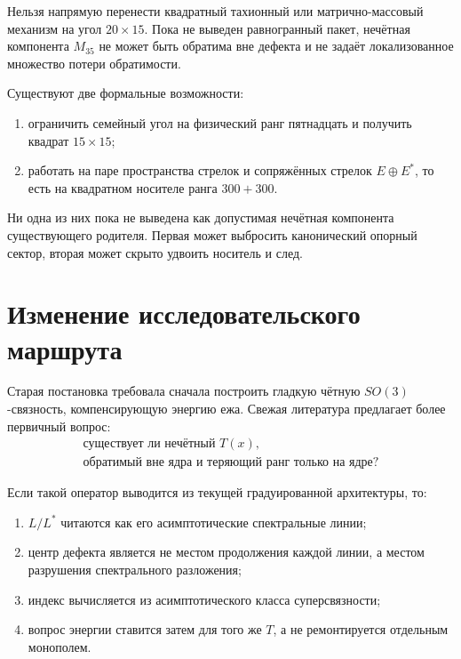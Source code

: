\begin{nogocriterion}
Нельзя напрямую перенести квадратный тахионный или матрично-массовый
механизм на угол $20\times15$. Пока не выведен равногранный пакет,
нечётная компонента $M_{35}$ не может быть обратима вне дефекта и не задаёт
локализованное множество потери обратимости.
\end{nogocriterion}

Существуют две формальные возможности:
\begin{enumerate}
 \item ограничить семейный угол на физический ранг пятнадцать и получить
 квадрат $15\times15$;
 \item работать на паре пространства стрелок и сопряжённых стрелок
 $E\oplus E^*$, то есть на квадратном носителе ранга $300+300$.
\end{enumerate}
Ни одна из них пока не выведена как допустимая нечётная компонента
существующего родителя. Первая может выбросить канонический опорный сектор,
вторая может скрыто удвоить носитель и след.

\section{Изменение исследовательского маршрута}

Старая постановка требовала сначала построить гладкую чётную
$SO(3)$-связность, компенсирующую энергию ежа. Свежая литература предлагает
более первичный вопрос:
\begin{equation}
 \boxed{
 \begin{gathered}
 \text{существует ли нечётный }T(x),\\
 \text{обратимый вне ядра и теряющий ранг только на ядре?}
 \end{gathered}}
\end{equation}

Если такой оператор выводится из текущей градуированной архитектуры, то:
\begin{enumerate}
 \item $L/L^*$ читаются как его асимптотические спектральные линии;
 \item центр дефекта является не местом продолжения каждой линии, а
 местом разрушения спектрального разложения;
 \item индекс вычисляется из асимптотического класса суперсвязности;
 \item вопрос энергии ставится затем для того же $T$, а не ремонтируется
 отдельным монополем.
\end{enumerate}

